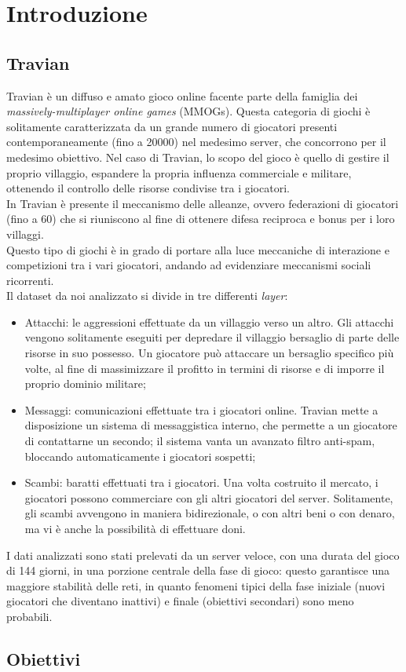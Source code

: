 \chapter{Introduzione}
\section{Travian}
Travian è un diffuso e amato gioco online facente parte della famiglia dei \textit{massively-multiplayer online games} (MMOGs).
Questa categoria di giochi è solitamente caratterizzata da un grande numero di giocatori presenti contemporaneamente (fino a 20000) nel medesimo server, che concorrono per il medesimo obiettivo.
Nel caso di Travian, lo scopo del gioco è quello di gestire il proprio villaggio, espandere la propria influenza commerciale e militare, ottenendo il controllo delle risorse condivise tra i giocatori.\\
In Travian è presente il meccanismo delle alleanze, ovvero federazioni di giocatori (fino a 60) che si riuniscono al fine di ottenere difesa reciproca e bonus per i loro villaggi.\\
Questo tipo di giochi è in grado di portare alla luce meccaniche di interazione e competizioni tra i vari giocatori, andando ad evidenziare meccanismi sociali ricorrenti.\\
Il dataset da noi analizzato si divide in tre differenti \textit{layer}:

\begin{itemize}
	\item Attacchi: le aggressioni effettuate da un villaggio verso un altro. Gli attacchi vengono solitamente eseguiti per depredare il villaggio bersaglio di parte delle risorse in suo possesso. Un giocatore può attaccare un bersaglio specifico più volte, al fine di massimizzare il profitto in termini di risorse e di imporre il proprio dominio militare;
	\item Messaggi: comunicazioni effettuate tra i giocatori online. Travian mette a disposizione un sistema di messaggistica interno, che permette a un giocatore di contattarne un secondo; il sistema vanta un avanzato filtro anti-spam, bloccando automaticamente i giocatori sospetti;
	\item Scambi: baratti effettuati tra i giocatori. Una volta costruito il mercato, i giocatori possono commerciare con gli altri giocatori del server. Solitamente, gli scambi avvengono in maniera bidirezionale, o con altri beni o con denaro, ma vi è anche la possibilità di effettuare doni.
\end{itemize}
I dati analizzati sono stati prelevati da un server veloce, con una durata del gioco di 144 giorni, in una porzione centrale della fase di gioco: questo garantisce una maggiore stabilità delle reti, in quanto fenomeni tipici della fase iniziale (nuovi giocatori che diventano inattivi) e finale (obiettivi secondari) sono meno probabili.

\section{Obiettivi}
